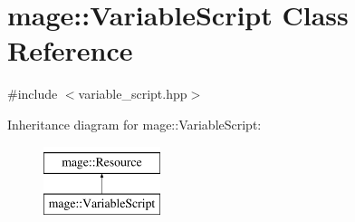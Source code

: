 \hypertarget{classmage_1_1_variable_script}{}\section{mage\+:\+:Variable\+Script Class Reference}
\label{classmage_1_1_variable_script}


{\ttfamily \#include $<$variable\+\_\+script.\+hpp$>$}

Inheritance diagram for mage\+:\+:Variable\+Script\+:\begin{figure}[H]
\begin{center}
\leavevmode
\includegraphics[height=2.000000cm]{classmage_1_1_variable_script}
\end{center}
\end{figure}
